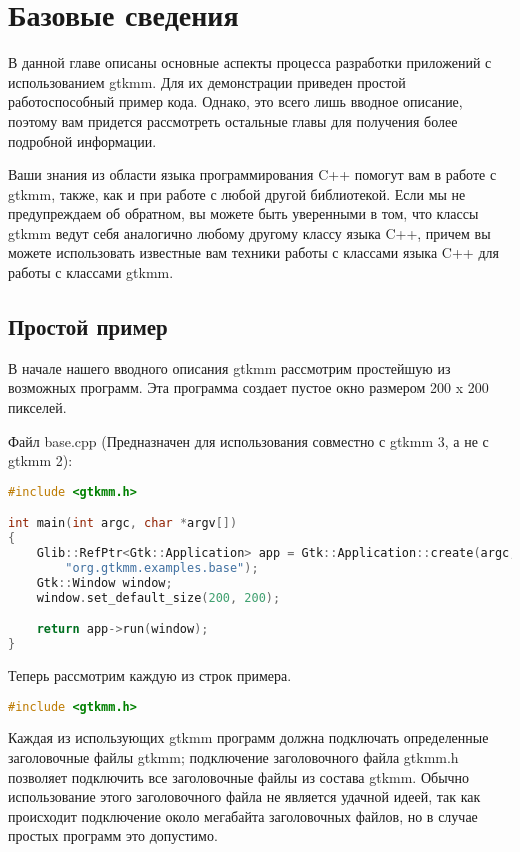 \chapter{Базовые сведения}
 В данной главе описаны основные аспекты процесса разработки приложений с использованием gtkmm. Для их демонстрации приведен простой работоспособный пример кода. Однако, это всего лишь вводное описание, поэтому вам придется рассмотреть остальные главы для получения более подробной информации.

Ваши знания из области языка программирования C++ помогут вам в работе с gtkmm, также, как и при работе с любой другой библиотекой. Если мы не предупреждаем об обратном, вы можете быть уверенными в том, что классы gtkmm ведут себя аналогично любому другому классу языка C++, причем вы можете использовать известные вам техники работы с классами языка C++ для работы с классами gtkmm. 

\section{Простой пример}
В начале нашего вводного описания gtkmm рассмотрим простейшую из возможных программ. Эта программа создает пустое окно размером 200 x 200 пикселей. 

Файл base.cpp (Предназначен для использования совместно с gtkmm 3, а не с gtkmm 2): 
\begin{lstlisting}[language=C++]
#include <gtkmm.h>

int main(int argc, char *argv[])
{
	Glib::RefPtr<Gtk::Application> app = Gtk::Application::create(argc, argv,
		"org.gtkmm.examples.base");
	Gtk::Window window;
	window.set_default_size(200, 200);

	return app->run(window);
}

\end{lstlisting}
Теперь рассмотрим каждую из строк примера. 
\begin{lstlisting}[language=C++]
#include <gtkmm.h>
\end{lstlisting}
Каждая из использующих gtkmm программ должна подключать определенные заголовочные файлы gtkmm; подключение заголовочного файла gtkmm.h позволяет подключить все заголовочные файлы из состава gtkmm. Обычно использование этого заголовочного файла не является удачной идеей, так как происходит подключение около мегабайта заголовочных файлов, но в случае простых программ это допустимо. 

